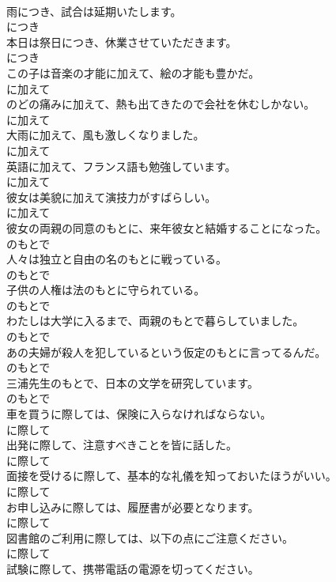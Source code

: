 \documentclass[8pt]{extreport}
\begin{document}
\begin{CJK}{UTF8}{min}
\\	雨につき、試合は延期いたします。	
\\	につき	
\\	本日は祭日につき、休業させていただきます。	
\\	につき	
\\	この子は音楽の才能に加えて、絵の才能も豊かだ。	
\\	に加えて	
\\	のどの痛みに加えて、熱も出てきたので会社を休むしかない。	
\\	に加えて	
\\	大雨に加えて、風も激しくなりました。	
\\	に加えて	
\\	英語に加えて、フランス語も勉強しています。	
\\	に加えて	
\\	彼女は美貌に加えて演技力がすばらしい。	
\\	に加えて	
\\	彼女の両親の同意のもとに、来年彼女と結婚することになった。	
\\	のもとで	
\\	人々は独立と自由の名のもとに戦っている。	
\\	のもとで	
\\	子供の人権は法のもとに守られている。	
\\	のもとで	
\\	わたしは大学に入るまで、両親のもとで暮らしていました。	
\\	のもとで	
\\	あの夫婦が殺人を犯しているという仮定のもとに言ってるんだ。	
\\	のもとで	
\\	三浦先生のもとで、日本の文学を研究しています。	
\\	のもとで	
\\	車を買うに際しては、保険に入らなければならない。	
\\	に際して	
\\	出発に際して、注意すべきことを皆に話した。	
\\	に際して	
\\	面接を受けるに際して、基本的な礼儀を知っておいたほうがいい。	
\\	に際して	
\\	お申し込みに際しては、履歴書が必要となります。	
\\	に際して	
\\	図書館のご利用に際しては、以下の点にご注意ください。	
\\	に際して	
\\	試験に際して、携帯電話の電源を切ってください。	

\end{CJK}
\end{document}
